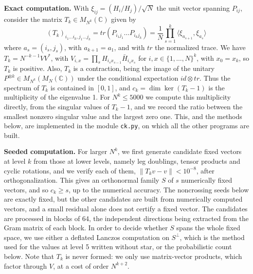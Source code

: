 \documentclass[11pt]{amsart}
\begin{document}
\medskip

\noindent\textbf{Exact computation.} With $\xi_{ij}=(H_i/H_j)/\sqrt N$ the unit vector spanning $P_{ij}$, consider the matrix $T_k\in M_{N^k}(\mathbb C)$ given by
$$(T_k)_{i_1\ldots i_k,j_1\ldots j_k}=tr(P_{i_1j_1}\ldots P_{i_kj_k})=\frac{1}{N}\prod_{s=1}^k\langle\xi_{a_{s+1}},\xi_{a_s}\rangle$$
where $a_s=(i_s,j_s)$, with $a_{k+1}=a_1$, and with $tr$ the normalized trace. We have $T_k=N^{-k-1}VV^*$, with $V_{i,x}=\prod_sH_{i_sx_{s-1}}\bar{H}_{i_sx_s}$ for $i,x\in\{1,\ldots,N\}^k$, with $x_0=x_k$, so $T_k$ is positive. Also, $T_k$ is a contraction, being the image of the unitary $P^{\otimes k}\in M_{N^k}(M_N(\mathbb C))$ under the conditional expectation $id\otimes tr$. Thus the spectrum of $T_k$ is contained in $[0,1]$, and $c_k=\dim\ker(T_k-1)$ is the multiplicity of the eigenvalue 1. For $N^k\leq5000$ we compute this multiplicity directly, from the singular values of $T_k-1$, and we record the ratio between the smallest nonzero singular value and the largest zero one. This, and the methods below, are implemented in the module \texttt{ck.py}, on which all the other programs are built.

\medskip

\noindent\textbf{Seeded computation.} For larger $N^k$, we first generate candidate fixed vectors at level $k$ from those at lower levels, namely leg doublings, tensor products and cyclic rotations, and we verify each of them, $\|T_kv-v\|<10^{-8}$, after orthogonalization. This gives an orthonormal family $S$ of $s$ numerically fixed vectors, and so $c_k\geq s$, up to the numerical accuracy. The noncrossing seeds below are exactly fixed, but the other candidates are built from numerically computed vectors, and a small residual alone does not certify a fixed vector. The candidates are processed in blocks of 64, the independent directions being extracted from the Gram matrix of each block. In order to decide whether $S$ spans the whole fixed space, we use either a deflated Lanczos computation on $S^\perp$, which is the method used for the values at level 5 written without star, or the probabilistic count below. Note that $T_k$ is never formed: we only use matrix-vector products, which factor through $V$, at a cost of order $N^{k+2}$.

\medskip
\end{document}
